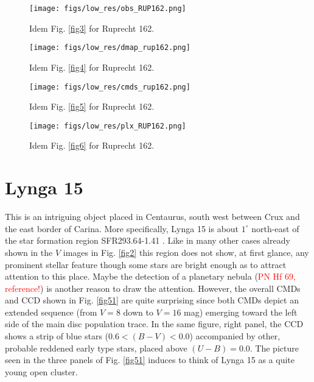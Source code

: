 \documentclass{aa}
\begin{document}
\begin{figure*}[ht]
    \centering
    \texttt{[image: figs/low\_res/obs\_RUP162.png]}
    \caption{Idem Fig. \ref{fig3} for Ruprecht 162.}
    \label{fig47}
\end{figure*}
\begin{figure*}[ht]
    \centering
    \texttt{[image: figs/low\_res/dmap\_rup162.png]}
    \caption{Idem Fig. \ref{fig4} for Ruprecht 162.}
    \label{fig48}
\end{figure*}
\begin{figure*}[ht]
    \centering
    \texttt{[image: figs/low\_res/cmds\_rup162.png]}
    \caption{Idem Fig. \ref{fig5} for Ruprecht 162.}
    \label{fig49}
\end{figure*}
\begin{figure*}[ht]
    \centering
    \texttt{[image: figs/low\_res/plx\_RUP162.png]}
    \caption{Idem Fig. \ref{fig6} for Ruprecht 162.}
    \label{fig50}
\end{figure*}




\section{Lynga 15}

This is an intriguing object placed in Centaurus, south west between Crux and the
east border of Carina. More specifically, Lynga 15 is about $1^\circ$ north-east
of the star formation region SFR293.64-1.41 \citep{Avedisova_2002}. Like in many
other cases already shown in the $V$ images in Fig. \ref{fig2} this region does
not show, at first glance, any prominent stellar feature though some stars are
bright enough as to attract attention to this place. Maybe the detection of a
planetary nebula (\textcolor{red}{PN Hf 69, reference!}) is another reason to
draw the attention. However, the overall CMDs and CCD shown in Fig. \ref{fig51}
are quite surprising since both CMDs depict an extended sequence (from $V = 8$
down to $V = 16$ mag) emerging toward the left side of the main disc population
trace. In the same figure, right panel, the CCD shows a strip of blue stars
($0.6<(B-V)<0.0$) accompanied by other, probable reddened early type stars,
placed above $(U-B) = 0.0$. The picture seen in the three panels of Fig.
\ref{fig51} induces to think of Lynga 15 as a quite young open cluster.\\
\end{document}
